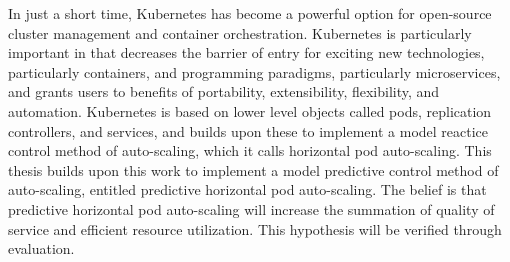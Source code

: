 In just a short time, Kubernetes has become a powerful option for open-source
cluster management and container orchestration. Kubernetes is particularly
important in that decreases the barrier of entry for exciting new technologies,
particularly containers, and programming paradigms, particularly microservices,
and grants users to benefits of portability, extensibility, flexibility, and
automation. Kubernetes is based on lower level objects called pods, replication
controllers, and services, and builds upon these to implement a model reactice
control method of auto-scaling, which it calls horizontal pod auto-scaling. This
thesis builds upon this work to implement a model predictive control method of
auto-scaling, entitled predictive horizontal pod auto-scaling. The belief is
that predictive horizontal pod auto-scaling will increase the summation of
quality of service and efficient resource utilization. This hypothesis will be
verified through evaluation.
